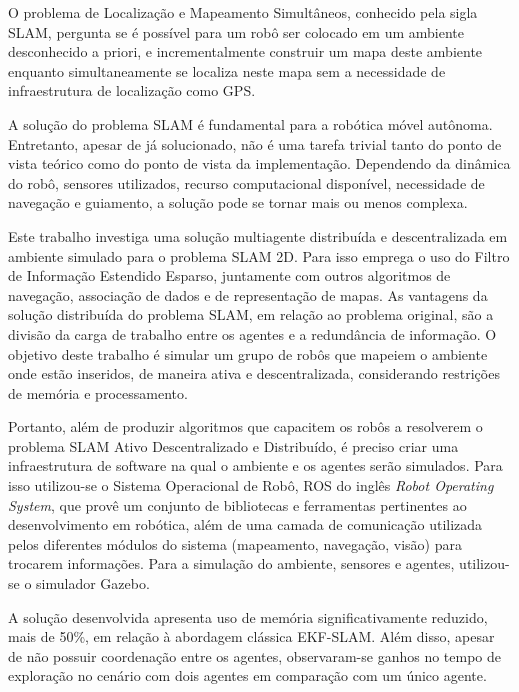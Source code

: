 O problema de Localização e Mapeamento Simultâneos, conhecido pela sigla SLAM, pergunta se é possível para um robô ser colocado em um ambiente 
desconhecido a priori, e incrementalmente construir um mapa deste 
ambiente enquanto simultaneamente se localiza neste mapa sem a 
necessidade de infraestrutura de localização como GPS.

A solução do problema SLAM é fundamental para a robótica móvel 
autônoma. Entretanto, apesar de já solucionado, não é uma tarefa trivial 
tanto do ponto de vista teórico como do ponto de vista da implementação. 
Dependendo da dinâmica do robô, sensores utilizados, recurso 
computacional disponível, necessidade de navegação e guiamento, a solução 
pode se tornar mais ou menos complexa.

Este trabalho investiga uma solução multiagente distribuída e descentralizada em ambiente simulado 
para o problema SLAM 2D. Para isso emprega o uso do Filtro de Informação 
Estendido Esparso, juntamente com outros algoritmos de navegação, associação de 
dados e de representação de mapas. As vantagens da solução distribuída do 
problema SLAM, em relação ao problema original, são a divisão da carga 
de trabalho entre os agentes e a redundância de informação. O objetivo deste trabalho é simular um grupo de 
robôs que mapeiem o ambiente onde estão inseridos, de maneira ativa e 
descentralizada, considerando restrições de memória e processamento.

Portanto, além de produzir algoritmos que capacitem os robôs a resolverem o 
problema SLAM Ativo Descentralizado e Distribuído, é preciso criar uma 
infraestrutura de software na qual o ambiente e os agentes serão simulados. Para 
isso utilizou-se o Sistema Operacional de Robô, ROS do inglês \textit{Robot 
Operating System}, que provê um conjunto de bibliotecas e ferramentas pertinentes 
ao desenvolvimento em robótica, além de uma camada de comunicação 
utilizada pelos diferentes módulos do sistema (mapeamento, navegação, 
visão) para trocarem informações. Para a simulação do ambiente, sensores e agentes, utilizou-se o simulador Gazebo.

A solução desenvolvida apresenta uso de memória significativamente 
reduzido, mais de 50\%, em relação à abordagem clássica EKF-SLAM. 
Além disso, apesar de não possuir coordenação entre os agentes, 
observaram-se ganhos no tempo de exploração no cenário com dois agentes 
em comparação com um único agente.
